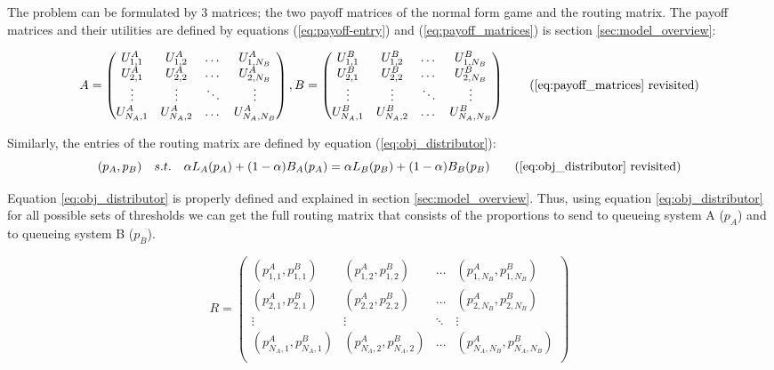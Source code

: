 The problem can be formulated by 3 matrices; the two payoff matrices of the 
normal form game and the routing matrix.
The payoff matrices and their utilities are defined by equations 
(\ref{eq:payoff-entry}) and (\ref{eq:payoff_matrices}) is section 
\ref{sec:model_overview}:

\begin{equation*}
    A = 
    \begin{pmatrix}
        U_{1,1}^A & U_{1,2}^A & \dots & U_{1,N_B}^A \\
        U_{2,1}^A & U_{2,2}^A & \dots & U_{2,N_B}^A \\
        \vdots & \vdots & \ddots & \vdots \\
        U_{N_A,1}^A & U_{N_A,2}^A & \dots & U_{N_A,N_B}^A \\
    \end{pmatrix},
    B = 
    \begin{pmatrix}
        U_{1,1}^B & U_{1,2}^B & \dots & U_{1,N_B}^B \\
        U_{2,1}^B & U_{2,2}^B & \dots & U_{2,N_B}^B \\
        \vdots & \vdots & \ddots & \vdots \\
        U_{N_A,1}^B & U_{N_A,2}^B & \dots & U_{N_A,N_B}^B \\
    \end{pmatrix}
    \tag{\ref{eq:payoff_matrices} revisited}
\end{equation*}


Similarly, the entries of the routing matrix are defined by equation 
(\ref{eq:obj_distributor}):
\begin{equation*}
    (p_A, p_B) \quad s.t. \quad 
    \alpha L_A(p_A) + (1 - \alpha) B_A(p_A) = 
    \alpha L_B(p_B) + (1 - \alpha) B_B(p_B)
    \tag{\ref{eq:obj_distributor} revisited}
\end{equation*}

Equation \ref{eq:obj_distributor} is properly defined and explained in section 
\ref{sec:model_overview}.
Thus, using equation \ref{eq:obj_distributor} for all possible sets of 
thresholds we can get the full routing matrix that consists of the proportions
to send to queueing system A (\(p_A\)) and to queueing system B (\(p_B\)).

\begin{equation}\label{eq:routing_matrix}
    R = 
    \begin{pmatrix}
        (p_{1,1}^A, p_{1,1}^B) & (p_{1,2}^A, p_{1,2}^B) & \dots & 
        (p_{1,N_B}^A, p_{1,N_B}^B) \\
        (p_{2,1}^A, p_{2,1}^B) & (p_{2,2}^A, p_{2,2}^B) & \dots & 
        (p_{2,N_B}^A, p_{2,N_B}^B) \\
        \vdots & \vdots & \ddots & \vdots \\
        (p_{N_A,1}^A, p_{N_A,1}^B) & (p_{N_A,2}^A, p_{N_A,2}^B) & \dots & 
        (p_{N_A,N_B}^A, p_{N_A,N_B}^B) \\
    \end{pmatrix}
\end{equation}

